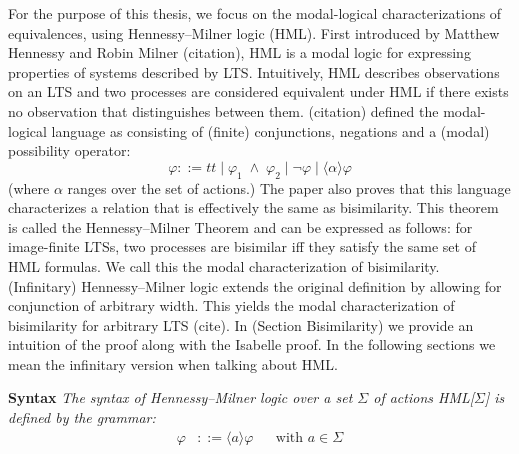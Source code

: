 %
\begin{isabellebody}%
%
%
\isadelimtheory
%
\endisadelimtheory
%
\isatagtheory
%
\endisatagtheory
{\isafoldtheory}%
%
\isadelimtheory
%
\endisadelimtheory
%
\isadelimdocument
%
\endisadelimdocument
%
\isatagdocument
%
\isamarkuptrue%
%
\endisatagdocument
{\isafolddocument}%
%
\isadelimdocument
%
\endisadelimdocument
%
\begin{isamarkuptext}%
For the purpose of this thesis, we focus on the modal-logical characterizations of equivalences, using Hennessy--Milner logic (HML). 
First introduced by Matthew Hennessy and Robin Milner (citation), HML is a modal logic for expressing properties of systems described by LTS.
Intuitively, HML describes observations on an LTS and two processes are considered equivalent under HML if there exists no observation that distinguishes between them.
(citation) defined the modal-logical language as consisting of (finite) conjunctions, negations and a (modal) possibility operator:
$$\varphi ::= t\!t \mid \varphi_1 \;\wedge\; \varphi_2 \mid \neg\varphi \mid \langle\alpha\rangle\varphi$$
(where $\alpha$ ranges over the set of actions.) The paper also proves that this language characterizes a relation that is effectively the same as bisimilarity. 
This theorem is called the Hennessy--Milner Theorem and can be expressed as follows: for image-finite LTSs, two processes are bisimilar iff they satisfy the same set of HML formulas. We call this the modal characterization of
bisimilarity. (Infinitary) Hennessy--Milner logic extends the original definition by allowing for conjunction of arbitrary width. 
This yields the modal characterization of bisimilarity for arbitrary LTS (cite). In (Section Bisimilarity) we provide an intuition of the proof along with the Isabelle proof.
In the following sections we mean the infinitary version when talking about HML.%
\end{isamarkuptext}\isamarkuptrue%
%
\isadelimdocument
%
\endisadelimdocument
%
\isatagdocument
%
\isamarkuptrue%
%
\endisatagdocument
{\isafolddocument}%
%
\isadelimdocument
%
\endisadelimdocument
%
\begin{isamarkuptext}%
\textbf{Syntax} \textit{The \textnormal{syntax of Hennessy--Milner logic} over a set $\Sigma$ of actions HML[$\Sigma$] is defined by the grammar:}
\begin{align*}
    \varphi &::= \langle a \rangle \varphi && \text{with } a \in \Sigma \\

\end{align*}
\end{isamarkuptext}
\end{isabellebody}

